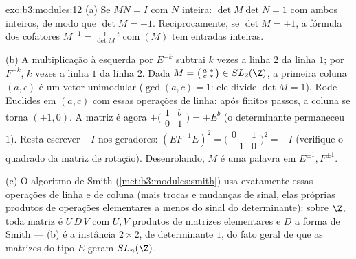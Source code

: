\begin{solution}{exo:b3:modules:12}
(a) Se $MN = I$ com $N$ inteira: $\det M\det N = 1$ com ambos inteiros, de modo
que $\det M = \pm1$. Reciprocamente, se $\det M =
\pm1$, a fórmula dos cofatores $M^{-1} =
\frac1{\det M}\,{}^t\!\operatorname{com}(M)$ tem
entradas inteiras.

(b) A multiplicação à esquerda por $E^{-k}$ subtrai $k$ vezes a
linha $2$ da linha $1$; por $F^{-k}$, $k$ vezes a linha
$1$ da linha $2$. Dada $M = \bigl(\begin{smallmatrix}a & *\\ c &
*\end{smallmatrix}\bigr) \in SL_2(\Z)$, a primeira coluna $(a, c)$ é um
vetor unimodular ($\gcd(a, c) = 1$: ele divide $\det M = 1$). Rode Euclides em $(a, c)$
com essas operações de linha: após finitos passos, a coluna se torna
$(\pm1, 0)$. A matriz é agora $\pm
\bigl(\begin{smallmatrix}1 & b\\ 0 & 1\end{smallmatrix}
\bigr) = \pm E^{b}$ (o determinante permaneceu $1$). Resta
escrever $-I$ nos geradores: $(EF^{-1}E)^2 =
\bigl(\begin{smallmatrix}0 & 1\\ -1 &
0\end{smallmatrix}\bigr)^2 = -I$ (verifique o quadrado da matriz de
rotação). Desenrolando, $M$ é uma palavra em $E^{\pm1},
F^{\pm1}$.

(c) O algoritmo de Smith (\cref{met:b3:modules:smith}) usa exatamente essas operações
de linha e de coluna (mais trocas e mudanças de sinal, elas próprias
produtos de operações elementares a menos do sinal do determinante):
sobre $\Z$, toda matriz é $U\,D\,V$ com $U, V$ produtos de matrizes
elementares e $D$ a forma de Smith --- (b) é a instância $2\times2$, de
determinante $1$, do fato geral de que as matrizes do tipo $E$
geram $SL_n(\Z)$.
\end{solution}

